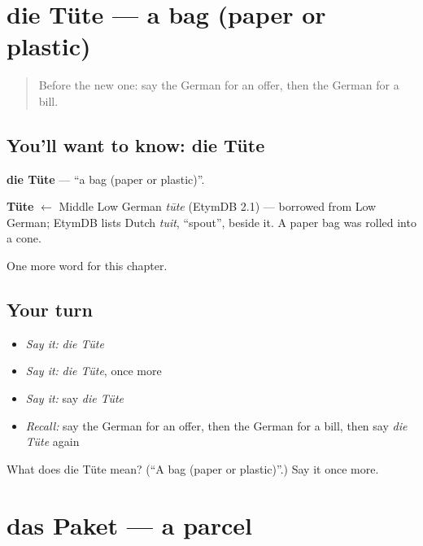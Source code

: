 \section[die Tüte]{die Tüte — a bag (paper or plastic)}

\label{lesson:GE-C158-tuete}



\begin{quote}
Before the new one: say the German for an offer, then the German for a bill.
\end{quote}

\subsection*{You'll want to know: die Tüte}
\textbf{die Tüte} — \textquotedblleft{}a bag (paper or plastic)\textquotedblright{}.

\begin{cousinweb}
\textbf{Tüte} $\leftarrow$ Middle Low German \emph{tūte} (EtymDB 2.1) — borrowed from Low German; EtymDB lists Dutch \emph{tuit}, \textquotedblleft{}spout\textquotedblright{}, beside it. A paper bag was rolled into a cone.
\end{cousinweb}

\begin{grammarlens}[title={What you've built}]
One more word for this chapter.
\end{grammarlens}

\subsection*{Your turn}
\begin{itemize}
\raggedright
  \item \emph{Say it:} \emph{die Tüte}
  \item \emph{Say it:} \emph{die Tüte}, once more
  \item \emph{Say it:} say \emph{die Tüte}
  \item \emph{Recall:} say the German for an offer, then the German for a bill, then say \emph{die Tüte} again
\end{itemize}

\begin{tcolorbox}[breakable,colback=teal!4,colframe=teal!35!black,title={Before you move on}]
What does die Tüte mean? (\textquotedblleft{}A bag (paper or plastic)\textquotedblright{}.) Say it once more.
\end{tcolorbox}
\section[das Paket]{das Paket — a parcel}

